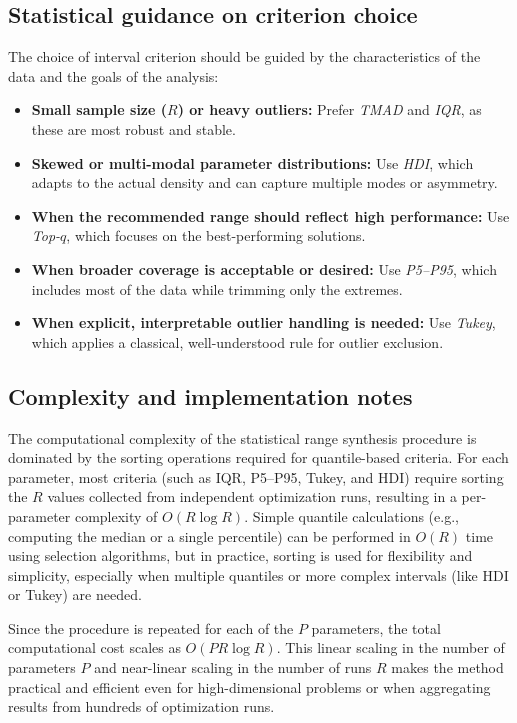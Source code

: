 \documentclass[12pt,a4paper]{article}
\begin{document}
\subsection{Statistical guidance on criterion choice}
The choice of interval criterion should be guided by the characteristics of the data and the goals of the analysis:
\begin{itemize}
    \item \textbf{Small sample size ($R$) or heavy outliers:} Prefer \emph{TMAD} and \emph{IQR}, as these are most robust and stable.
    \item \textbf{Skewed or multi-modal parameter distributions:} Use \emph{HDI}, which adapts to the actual density and can capture multiple modes or asymmetry.
    \item \textbf{When the recommended range should reflect high performance:} Use \emph{Top-$q$}, which focuses on the best-performing solutions.
    \item \textbf{When broader coverage is acceptable or desired:} Use \emph{P5--P95}, which includes most of the data while trimming only the extremes.
    \item \textbf{When explicit, interpretable outlier handling is needed:} Use \emph{Tukey}, which applies a classical, well-understood rule for outlier exclusion.
\end{itemize}

\subsection{Complexity and implementation notes}
The computational complexity of the statistical range synthesis procedure is dominated by the sorting operations required for quantile-based criteria. For each parameter, most criteria (such as IQR, P5--P95, Tukey, and HDI) require sorting the $R$ values collected from independent optimization runs, resulting in a per-parameter complexity of $O(R \log R)$. Simple quantile calculations (e.g., computing the median or a single percentile) can be performed in $O(R)$ time using selection algorithms, but in practice, sorting is used for flexibility and simplicity, especially when multiple quantiles or more complex intervals (like HDI or Tukey) are needed.

Since the procedure is repeated for each of the $P$ parameters, the total computational cost scales as $O(P R \log R)$. This linear scaling in the number of parameters $P$ and near-linear scaling in the number of runs $R$ makes the method practical and efficient even for high-dimensional problems or when aggregating results from hundreds of optimization runs. 
\end{document}
